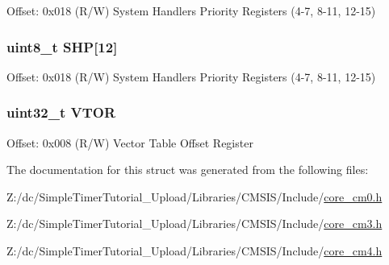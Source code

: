 Offset\-: 0x018 (R/\-W) System Handlers Priority Registers (4-\/7, 8-\/11, 12-\/15) \hypertarget{struct_s_c_b___type_a17dc9f83c53cbf7fa249e79a2d2a43f8}{
\subsubsection[{S\-H\-P}]{ uint8\-\_\-t S\-H\-P\mbox{[}12\mbox{]}}}\label{struct_s_c_b___type_a17dc9f83c53cbf7fa249e79a2d2a43f8}
Offset\-: 0x018 (R/\-W) System Handlers Priority Registers (4-\/7, 8-\/11, 12-\/15) \hypertarget{struct_s_c_b___type_aaf388a921a016cae590cfcf1e43b1cdf}{
\subsubsection[{V\-T\-O\-R}]{ uint32\-\_\-t V\-T\-O\-R}}\label{struct_s_c_b___type_aaf388a921a016cae590cfcf1e43b1cdf}
Offset\-: 0x008 (R/\-W) Vector Table Offset Register 

The documentation for this struct was generated from the following files\-:\begin{DoxyCompactItemize}
\item 
Z\-:/dc/\-Simple\-Timer\-Tutorial\-\_\-\-Upload/\-Libraries/\-C\-M\-S\-I\-S/\-Include/\hyperlink{core__cm0_8h}{core\-\_\-cm0.\-h}\item 
Z\-:/dc/\-Simple\-Timer\-Tutorial\-\_\-\-Upload/\-Libraries/\-C\-M\-S\-I\-S/\-Include/\hyperlink{core__cm3_8h}{core\-\_\-cm3.\-h}\item 
Z\-:/dc/\-Simple\-Timer\-Tutorial\-\_\-\-Upload/\-Libraries/\-C\-M\-S\-I\-S/\-Include/\hyperlink{core__cm4_8h}{core\-\_\-cm4.\-h}\end{DoxyCompactItemize}
